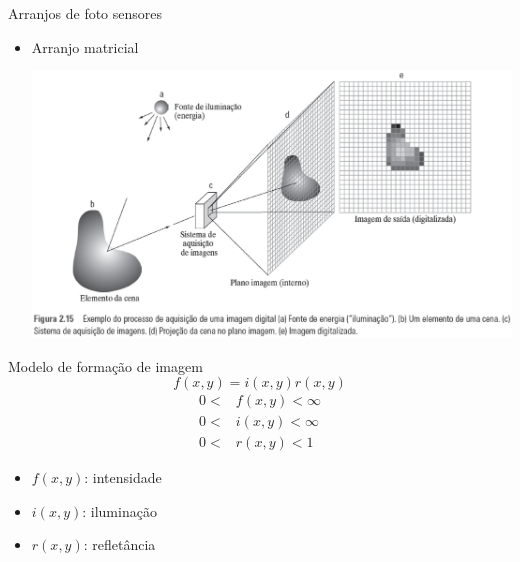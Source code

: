    \begin{slide}[toc=]{Arranjos de foto sensores}
      \begin{itemize}[type=1]
         \item Arranjo matricial
            \begin{center}
               \includegraphics[width=.8\textwidth]{figs/fig0215}
            \end{center}
      \end{itemize}
   \end{slide}
   
    \begin{slide}[toc=]{Modelo de formação de imagem}
       \begin{equation*}
          f(x,y) = i(x,y)r(x,y) 
       \end{equation*}
      \begin{align*}
         0<&f(x,y)<\infty\\
         0<&i(x,y)<\infty\\
         0<&r(x,y)<1
      \end{align*}
      \begin{itemize}
       \item $f(x,y)$: intensidade
       \item $i(x,y)$: iluminação
       \item $r(x,y)$: refletância
      \end{itemize}
    \end{slide}

